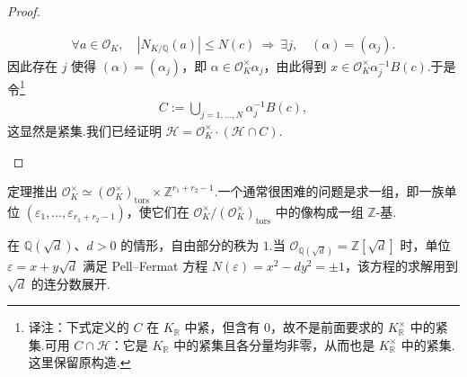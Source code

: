 \begin{proof}
\begin{enumerate}[label=(\alph*)]
\begin{align*}
\forall a\in\mathcal O_K,\quad |N_{K/\mathbb Q}(a)|\le N(c)\ \Longrightarrow\ \exists j,\quad(\alpha)=(\alpha_j).
\end{align*}
因此存在 $j$ 使得 $(\alpha)=(\alpha_j)$，即 $\alpha\in\mathcal O_K^\times\alpha_j$，由此得到 $x\in\mathcal O_K^\times\alpha_j^{-1}B(c)$.于是令\footnote{译注：下式定义的 $C$ 在 $K_{\mathbb R}$ 中紧，但含有 $0$，故不是前面要求的 $K_{\mathbb R}^\times$ 中的紧集.可用 $C\cap\mathcal H$：它是 $K_{\mathbb R}$ 中的紧集且各分量均非零，从而也是 $K_{\mathbb R}^\times$ 中的紧集.这里保留原构造.}
\begin{align*}
C:=\bigcup_{j=1,\ldots,N}\alpha_j^{-1}B(c),
\end{align*}
这显然是紧集.我们已经证明 $\mathcal H=\mathcal O_K^\times\cdot(\mathcal H\cap C)$.\qedhere
\end{enumerate}
\end{proof}
定理推出 $\mathcal O_K^\times\simeq(\mathcal O_K^\times)_{\mathrm{tors}}\times\mathbb Z^{r_1+r_2-1}$.一个通常很困难的问题是求一组，即一族单位 $(\varepsilon_1,\ldots,\varepsilon_{r_1+r_2-1})$，使它们在 $\mathcal O_K^\times/(\mathcal O_K^\times)_{\mathrm{tors}}$ 中的像构成一组 $\mathbb Z$-基.
\begin{example*}
在 $\mathbb Q(\sqrt d)$、$d>0$ 的情形，自由部分的秩为 $1$.当 $\mathcal O_{\mathbb Q(\sqrt d)}=\mathbb Z[\sqrt d]$ 时，单位 $\varepsilon=x+y\sqrt d$ 满足 Pell--Fermat 方程 $N(\varepsilon)=x^2-dy^2=\pm1$，该方程的求解用到 $\sqrt d$ 的连分数展开.
\end{example*}
